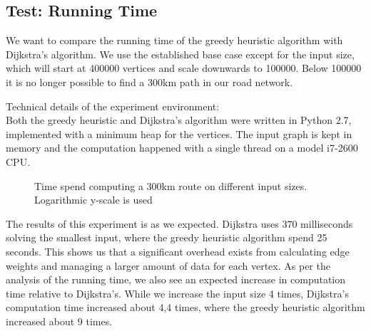 \subsection{Test: Running Time}
We want to compare the running time of the greedy heuristic algorithm with Dijkstra's algorithm. We use the established base case except for the input size, which will start at 400000 vertices and scale downwards to 100000. Below 100000 it is no longer possible to find a 300km path in our road network.

Technical details of the experiment environment:\\
Both the greedy heuristic and Dijkstra's algorithm were written in Python 2.7, implemented with a minimum heap for the vertices. The input graph is kept in memory and the computation happened with a single thread on a model i7-2600 CPU.
\begin{figure}[!htb]
\centering
{}
\caption{Time spend computing a 300km route on different input sizes. Logarithmic y-scale is used} 
\label{fig:time_comp}
\end{figure}

The results of this experiment is as we expected. Dijkstra uses 370 milliseconds solving the smallest input, where the greedy heuristic algorithm spend 25 seconds. This shows us that a significant overhead exists from calculating edge weights and managing a larger amount of data for each vertex. As per the analysis of the running time, we also see an expected increase in computation time relative to Dijkstra's. While we increase the input size 4 times, Dijkstra's computation time increased about 4,4 times, where the greedy heuristic algorithm increased about 9 times.